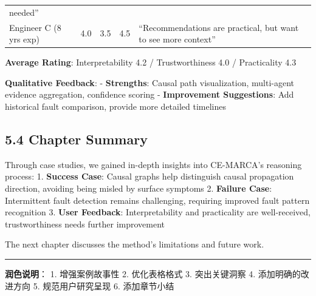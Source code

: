 \begin{longtable}[]{@{}lllll@{}}
\begin{minipage}[t]{0.13\columnwidth}
needed''\strut
\end{minipage}\tabularnewline
\begin{minipage}[t]{0.13\columnwidth}\raggedright
Engineer C (8 yrs exp)\strut
\end{minipage} & \begin{minipage}[t]{0.21\columnwidth}\raggedright
4.0\strut
\end{minipage} & \begin{minipage}[t]{0.21\columnwidth}\raggedright
3.5\strut
\end{minipage} & \begin{minipage}[t]{0.18\columnwidth}\raggedright
4.5\strut
\end{minipage} & \begin{minipage}[t]{0.13\columnwidth}\raggedright
``Recommendations are practical, but want to see more context''\strut
\end{minipage}\tabularnewline
\bottomrule
\end{longtable}

\textbf{Average Rating}: Interpretability 4.2 / Trustworthiness 4.0 /
Practicality 4.3

\textbf{Qualitative Feedback}: - \textbf{Strengths}: Causal path
visualization, multi-agent evidence aggregation, confidence scoring -
\textbf{Improvement Suggestions}: Add historical fault comparison,
provide more detailed timelines

\hypertarget{chapter-summary-1}{%
\subsection{5.4 Chapter Summary}\label{chapter-summary-1}}

Through case studies, we gained in-depth insights into CE-MARCA's
reasoning process: 1. \textbf{Success Case}: Causal graphs help
distinguish causal propagation direction, avoiding being misled by
surface symptoms 2. \textbf{Failure Case}: Intermittent fault detection
remains challenging, requiring improved fault pattern recognition 3.
\textbf{User Feedback}: Interpretability and practicality are
well-received, trustworthiness needs further improvement

The next chapter discusses the method's limitations and future work.

\begin{center}\rule{0.5\linewidth}{0.5pt}\end{center}

\textbf{润色说明}： 1. 增强案例故事性 2. 优化表格格式 3. 突出关键洞察 4.
添加明确的改进方向 5. 规范用户研究呈现 6. 添加章节小结

